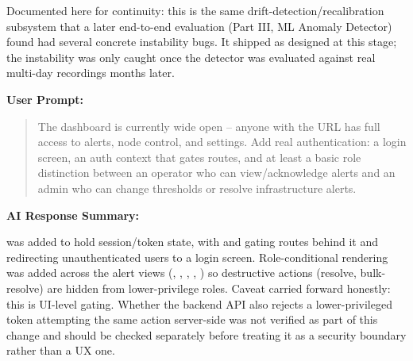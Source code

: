 \documentclass[conference]{IEEEtran}
\begin{document}
Documented here for continuity: this is the same drift-detection/recalibration subsystem that a later end-to-end evaluation (Part III, ML Anomaly Detector) found had several concrete instability bugs. It shipped as designed at this stage; the instability was only caught once the detector was evaluated against real multi-day recordings months later.

\par\vspace{4pt}\par\vspace{2pt}

\noindent\textbf{User Prompt:}\par

\begin{quote}
The dashboard is currently wide open -- anyone with the URL has full access to alerts, node control, and settings. Add real authentication: a login screen, an auth context that gates routes, and at least a basic role distinction between an operator who can view/acknowledge alerts and an admin who can change thresholds or resolve infrastructure alerts.
\end{quote}

\noindent\textbf{AI Response Summary:}\par

\texttt{} was added to hold session/token state, with \texttt{} and \texttt{} gating routes behind it and redirecting unauthenticated users to a login screen. Role-conditional rendering was added across the alert views (\texttt{}, \texttt{}, \texttt{}, \texttt{}, \texttt{}) so destructive actions (resolve, bulk-resolve) are hidden from lower-privilege roles. Caveat carried forward honestly: this is UI-level gating. Whether the backend API also rejects a lower-privileged token attempting the same action server-side was not verified as part of this change and should be checked separately before treating it as a security boundary rather than a UX one.

\par\vspace{4pt}\par\vspace{2pt}
\end{document}
